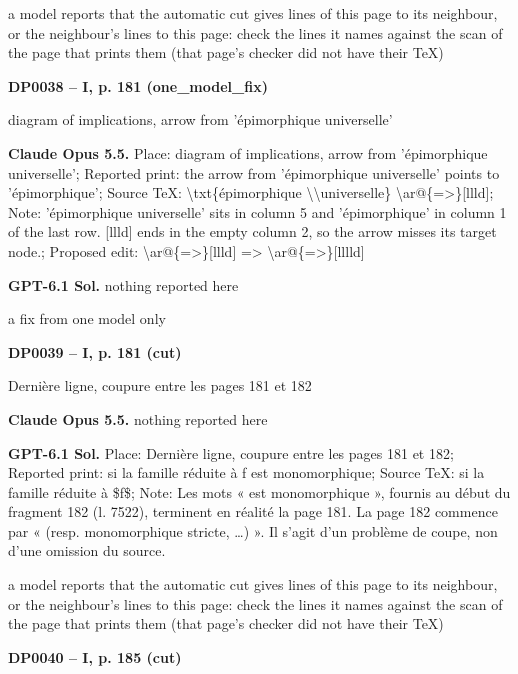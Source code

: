 a model reports that the automatic cut gives lines of this page to its neighbour, or the neighbour's lines to this page: check the lines it names against the scan of the page that prints them (that page's checker did not have their TeX)\par
\par\noindent\hypertarget{DP0038}{}\textbf{DP0038 -- I, p. 181 (one\_model\_fix)}\par
diagram of implications, arrow from 'épimorphique universelle'\par
\textbf{Claude Opus 5.5.} Place: diagram of implications, arrow from 'épimorphique universelle'; Reported print: the arrow from 'épimorphique universelle' points to 'épimorphique'; Source TeX: \textbackslash{}txt\{épimorphique \textbackslash{}\textbackslash{}universelle\} \textbackslash{}ar@\{=\allowbreak >\}[llld]; Note: 'épimorphique universelle' sits in column 5 and 'épimorphique' in column 1 of the last row. [llld] ends in the empty column 2, so the arrow misses its target node.; Proposed edit: \textbackslash{}ar@\{=\allowbreak >\}[llld] =\allowbreak > \textbackslash{}ar@\{=\allowbreak >\}[lllld]\par
\textbf{GPT-6.1 Sol.} nothing reported here\par
a fix from one model only\par
\par\noindent\hypertarget{DP0039}{}\textbf{DP0039 -- I, p. 181 (cut)}\par
Dernière ligne, coupure entre les pages 181 et 182\par
\textbf{Claude Opus 5.5.} nothing reported here\par
\textbf{GPT-6.1 Sol.} Place: Dernière ligne, coupure entre les pages 181 et 182; Reported print: si la famille réduite à f est monomorphique; Source TeX: si la famille réduite à \$f\$; Note: Les mots « est monomorphique », fournis au début du fragment 182 (l. 7522), terminent en réalité la page 181. La page 182 commence par « (resp. monomorphique stricte, …) ». Il s’agit d’un problème de coupe, non d’une omission du source.\par
a model reports that the automatic cut gives lines of this page to its neighbour, or the neighbour's lines to this page: check the lines it names against the scan of the page that prints them (that page's checker did not have their TeX)\par
\par\noindent\hypertarget{DP0040}{}\textbf{DP0040 -- I, p. 185 (cut)}\par
